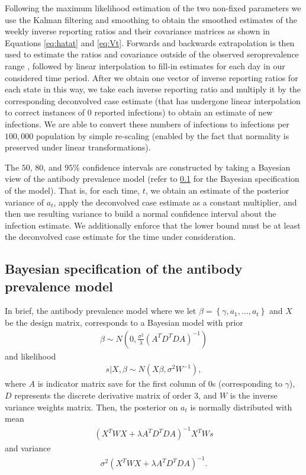 \documentclass{article}
\begin{document}
Following the maximum likelihood estimation of the two non-fixed parameters
we use the Kalman filtering and smoothing to obtain the
smoothed estimates of the weekly inverse reporting ratios and
their covariance matrices as shown in Equations \ref{eq:hatat} and \ref{eq:Vt}.
Forwards and backwards extrapolation is then used to estimate the ratios and covariance
outside of the observed seroprevalence range \citep{durbin2012time}, followed by linear 
interpolation to fill-in estimates for each day in our considered time period. 
After we obtain one vector of inverse reporting ratios for each state in this
way, we take each inverse reporting ratio and multiply it by the corresponding
deconvolved case estimate (that has undergone linear interpolation to correct
instances of $0$ reported infections) to obtain an estimate of new infections.
We are able to convert these numbers of infections to
infections per $100,000$ population by simple re-scaling (enabled by the fact
that normality is preserved under linear transformations).

The $50$, $80$, and $95\%$ confidence intervals are constructed by taking a
Bayesian view of the antibody prevalence model (refer to \ref{supp:bayeswaning} 
for the Bayesian specification of the model). 
That is, for each time, $t$, we obtain an estimate of the
posterior variance of $a_t$, apply the deconvolved case estimate as a constant
multiplier, and then use resulting variance to build a normal confidence
interval about the infection estimate. We additionally enforce that the lower
bound must be at least the deconvolved case estimate for the time under consideration.


\subsection{Bayesian specification of the antibody prevalence
model}\label{supp:bayeswaning} 
In brief, the antibody prevalence model where we let
$\beta = \left \{  \gamma, a_1,\dots, a_t \right \}$ and $X$ be the design
matrix, corresponds to a Bayesian model with prior 
\begin{align*}
    \beta \sim N \left( 0,  \frac{\sigma^2 }{ \lambda} \left( A^TD^TDA 
    \right)^{-1}  \right)
\end{align*} and likelihood 
\begin{align*}
    s|X,\beta \sim N \left( X\beta, \sigma^2W^{-1} \right),
\end{align*} where $A$ is indicator matrix save for the first column of $0$s 
(corresponding to $\gamma$), $D$ represents the discrete derivative matrix of 
order $3$, and $W$ is the inverse variance weights matrix. Then, the posterior 
on $a_t$ is normally distributed with mean 
\begin{align*}
    \left ( X^TWX + \lambda A^TD^TDA \right )^{-1}X^TWs
\end{align*} 
and variance 
\begin{align*}
    \sigma^2 (X^TWX + \lambda A^TD^TDA)^{-1}.
\end{align*}
\end{document}
